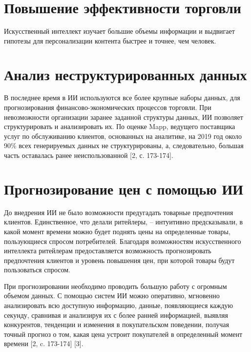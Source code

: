 \documentclass{article}
\begin{document}
\section{Повышение эффективности торговли}
\normalsize{\hspace{5mm}Искусственный интеллект изучает большие объемы информации и выдвигает гипотезы для персонализации контента быстрее и точнее, чем человек.}
\section{Анализ неструктурированных данных}
\normalsize{\hspace{5mm}В последнее время в ИИ используются все более крупные наборы данных, для прогнозирования финансово-экономических процессов торговли. При невозможности организации заранее заданной структуры данных, ИИ позволяет структурировать и анализировать их. По оценке Mapp, ведущего поставщика услуг по обслуживанию клиентов, основанных на аналитике, на 2019 год около 90\% всех генерируемых данных не структурированы, а, следовательно, большая часть оставалась ранее неиспользованной [2, с. 173-174].}
\section{Прогнозирование цен с помощью ИИ}
\normalsize{\hspace{5mm}До внедрения ИИ не было возможности предугадать товарные предпочтения клиентов. Единственное, что делали ритейлеры, – интуитивно предсказывали, в какой момент времени можно будет поднять цены на определенные товары, пользующиеся спросом потребителей. Благодаря возможностям искусственного интеллекта ритейлерам предоставляется возможность прогнозировать предпочтения клиентов и уровень повышения цен, при которой товары будут пользоваться спросом.

При прогнозировании необходимо проводить большую работу с огромным объемом данных. С помощью систем ИИ можно оперативно, мгновенно анализировать всю доступную информацию, данные, появляющиеся каждую секунду, сравнивая и анализируя их с более ранней информацией, выявляя конкурентов, тенденции и изменения в покупательском поведении, получая точный прогноз о том, какая цена устроит покупателей в определенный момент времени [2, c. 173-174] [3].}
\end{document}
